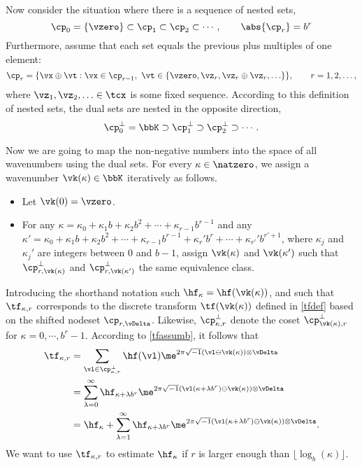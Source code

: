 \documentclass[]{elsarticle}
\begin{document}
Now consider the situation where there is a sequence of nested sets,
\[
\cp_0 = \{\vzero\} \subset \cp_{1} \subset \cp_{2} \subset \cdots, \qquad \abs{\cp_r} = b^r
\]
Furthermore, assume that each set equals the previous plus multiples of one element:
\begin{equation*}
\cp_r = \{ \vx \oplus \vt : \vx \in \cp_{r-1},\ \vt \in \{\vzero, \vz_r, \vz_r\oplus\vz_r, \ldots \} \}, \qquad r=1, 2, \ldots,
\end{equation*}
where $\vz_1, \vz_2, \ldots \in \tcx$ is some fixed sequence.  According to this definition of nested sets, the dual sets are nested in the opposite direction,
\begin{equation*}
\cp_0^\perp = \bbK \supset \cp_{1}^\perp \supset \cp_{2}^\perp \supset \cdots.
\end{equation*}

Now we are going to map the non-negative numbers into the space of all wavenumbers using the dual sets.  For every $\kappa \in \natzero$, we assign a wavenumber $\vk(\kappa) \in \bbK$ iteratively as follows.  
\begin{itemize}

\item Let $\vk(0)= \vzero$.

\item For any $\kappa = \kappa_0 + \kappa_1 b + \kappa_2 b^2 + \cdots + \kappa_{r-1} b^{r-1}$ and any $\kappa' = \kappa_0 + \kappa_1 b + \kappa_2 b^2 + \cdots + \kappa_{r-1} b^{r-1} + \kappa_{r}' b^{r} + \cdots +\kappa_{r'}' b^{r'+1}$, where $\kappa_j$ and $\kappa_j'$ are integers between $0$ and $b-1$, assign $\vk(\kappa)$ and $\vk(\kappa')$ such that $\cp^{\perp}_{r,\vk(\kappa)}$ and $\cp^{\perp}_{r,\vk(\kappa')}$ the same equivalence class.
\end{itemize}

Introducing the shorthand notation such $\hf_{\kappa}=\hf(\vk(\kappa))$, and such that $\tf_{\kappa,r}$ corresponds to the discrete transform $\tf(\vk(\kappa))$ defined in \eqref{tfdef} based on the shifted nodeset $\cp_{r,\vDelta}$.  Likewise, $\cp^{\perp}_{\kappa,r}$ denote the coset $\cp^{\perp}_{\vk(\kappa),r}$ for $\kappa=0, \cdots, b^r-1$. According to \eqref{tfassumb}, it follows that 
\begin{align}
\nonumber
\tf_{\kappa,r} &= \sum_{\vl \in \cp^{\perp}_{\kappa,r}} \hf(\vl) \me^{2 \pi \sqrt{-1} (\vl \ominus \vk(\kappa)) \otimes \vDelta} \\
\nonumber
&= \sum_{\lambda=0}^{\infty} \hf_{\kappa+\lambda b^{r}} \me^{2 \pi \sqrt{-1} (\vl(\kappa+\lambda b^{r}) \ominus \vk(\kappa)) \otimes \vDelta} \\
& = \hf_{\kappa} + \sum_{\lambda=1}^{\infty} \hf_{\kappa+\lambda b^{r}} \me^{2 \pi \sqrt{-1} (\vl(\kappa+\lambda b^{r}) \ominus \vk(\kappa)) \otimes \vDelta}.
\label{tfassumc}
\end{align}
We want to use $\tf_{\kappa,r}$ to estimate $\hf_{\kappa}$ if $r$ is larger enough than $\lfloor \log_b(\kappa) \rfloor$.
\end{document}
